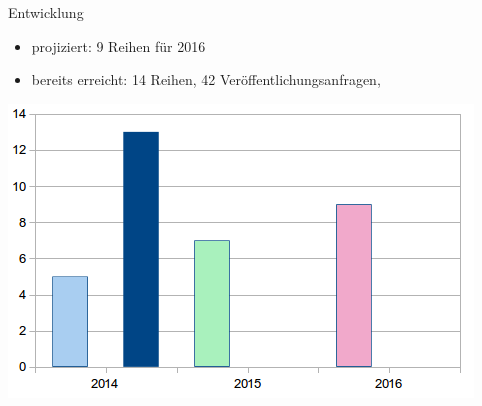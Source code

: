 \documentclass[final]{beamer}
\begin{document}
\begin{frame}{}
\begin{columns}[t]
\begin{column}{.45\linewidth}
    \begin{block}{Entwicklung}
      \begin{itemize}
      \item projiziert: 9 Reihen f{\"u}r 2016
      \item bereits erreicht: 14 Reihen, 42 Ver{\"o}ffentlichungsanfragen, 
      \end{itemize} 
    \includegraphics{reihen.png}
    \end{block}


   
  \end{column}
  \begin{column}{.45\linewidth}
 

\end{column}
\end{columns}
\end{frame}
\end{document}
